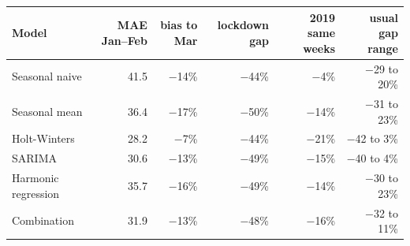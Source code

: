 \begin{tabular}{|l|r|r|r|r|r|}
\hline
\textbf{Model} & \textbf{MAE Jan--Feb} & \textbf{bias to Mar} & \textbf{lockdown gap} & \textbf{2019 same weeks} & \textbf{usual gap range} \\\hline
Seasonal naive & 41.5 & \ensuremath{-}14\% & \ensuremath{-}44\% & \ensuremath{-}4\% & \ensuremath{-}29 to 20\% \\\hline
Seasonal mean & 36.4 & \ensuremath{-}17\% & \ensuremath{-}50\% & \ensuremath{-}14\% & \ensuremath{-}31 to 23\% \\\hline
Holt-Winters & 28.2 & \ensuremath{-}7\% & \ensuremath{-}44\% & \ensuremath{-}21\% & \ensuremath{-}42 to 3\% \\\hline
SARIMA & 30.6 & \ensuremath{-}13\% & \ensuremath{-}49\% & \ensuremath{-}15\% & \ensuremath{-}40 to 4\% \\\hline
Harmonic regression & 35.7 & \ensuremath{-}16\% & \ensuremath{-}49\% & \ensuremath{-}14\% & \ensuremath{-}30 to 23\% \\\hline
Combination & 31.9 & \ensuremath{-}13\% & \ensuremath{-}48\% & \ensuremath{-}16\% & \ensuremath{-}32 to 11\% \\\hline
\end{tabular}
